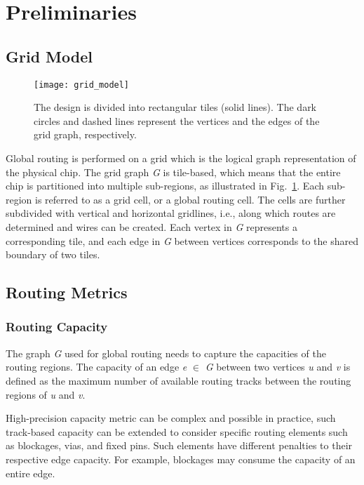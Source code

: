 \section{Preliminaries}
\label{sec:prelim}

\subsection{Grid Model}
\label{subsec:grid model}

\begin{figure}[tb!]
    \centering
    \texttt{[image: grid\_model]}
	\caption{The design is divided into rectangular tiles (solid lines). The dark
		circles and dashed lines represent the vertices and the edges of the grid graph, respectively.}
	\label{fig:grid_model}
\end{figure}

Global routing is performed on a grid which is the logical graph representation of the physical chip. The grid graph \emph{G} is tile-based, which means that the entire chip is partitioned into multiple sub-regions, as illustrated in Fig.~\ref{fig:grid_model}. Each sub-region is referred to as a grid cell, or a global routing cell. The cells are further subdivided with vertical and horizontal gridlines, i.e., along which routes are determined and wires can be created. Each vertex in \emph{G} represents a corresponding tile, and each edge in \emph{G} between vertices corresponds to the shared boundary of two tiles.

\subsection{Routing Metrics}
\subsubsection{Routing Capacity}
The graph \emph{G} used for global routing needs to capture the capacities of the routing regions. The capacity of an edge \emph{e} $\in$ \emph{G} between two vertices \emph{u} and \emph{v} is defined as the maximum number of available routing tracks between the routing regions of \emph{u} and \emph{v}. 

High-precision capacity metric can be complex and possible in practice, such track-based capacity can be extended to consider specific routing elements such as blockages, vias, and fixed pins. Such elements have different penalties to their respective edge capacity. For example, blockages may consume the capacity of an entire edge. 

